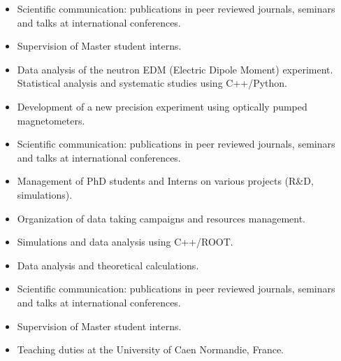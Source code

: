\documentclass[10pt,a4paper,ragged2e]{altacv}
\begin{document}
\divider

\begin{itemize}
\item Scientific communication: publications in peer reviewed journals, seminars and talks at international conferences.
\item Supervision of Master student interns.
\item Data analysis of the neutron EDM (Electric Dipole Moment) experiment. Statistical analysis and systematic studies using C++/Python.
\item Development of a new precision experiment using optically pumped magnetometers.
\end{itemize}

\divider

\begin{itemize}
\item Scientific communication: publications in peer reviewed journals, seminars and talks at international conferences.
\item Management of PhD students and Interns on various projects (R\&D, simulations).
\item Organization of data taking campaigns and resources management.
\item Simulations and data analysis using C++/ROOT.
\end{itemize}

\divider

\begin{itemize}
\item Data analysis and theoretical calculations.
\item Scientific communication: publications in peer reviewed journals, seminars and talks at international conferences.
\item Supervision of Master student interns.
\item Teaching duties at the University of Caen Normandie, France.
\end{itemize}


\end{document}
